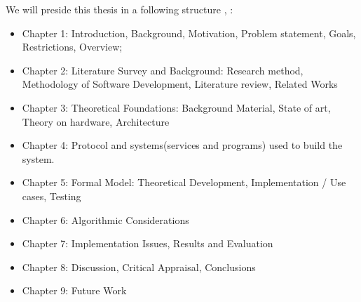 \par We will preside this thesis in a following structure \cite{David-Vernon}, \cite{David-Vernon1}:
\begin{itemize}
\item Chapter 1: Introduction, Background, Motivation, Problem statement, Goals, Restrictions, Overview;
\item Chapter 2: Literature Survey and Background:  Research method, Methodology of Software Development, Literature review, Related Works
\item Chapter 3: Theoretical Foundations: Background Material, State of art, Theory on hardware, Architecture
\item Chapter 4: Protocol and systems(services and programs) used to build the system.
\item Chapter 5: Formal Model: Theoretical Development, Implementation / Use cases, Testing
\item Chapter 6: Algorithmic Considerations
\item Chapter 7: Implementation Issues, Results and Evaluation
\item Chapter 8: Discussion, Critical Appraisal, Conclusions
\item Chapter 9: Future Work 
\end{itemize}




